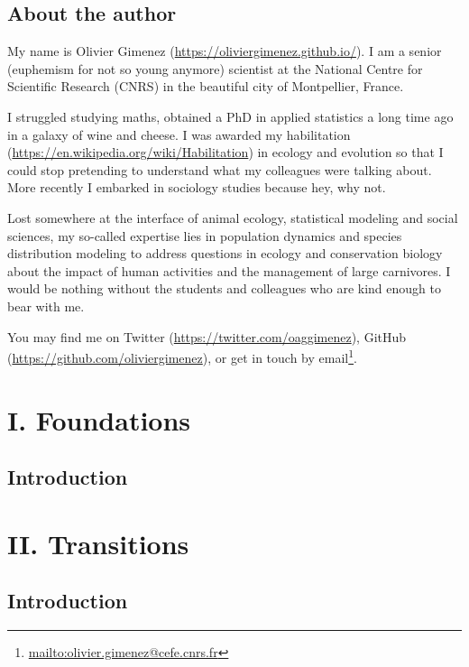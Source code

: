 \documentclass[
  12pt,
]{krantz}
\renewcommand{\href}[2]{#2\footnote{\url{#1}}}
\begin{document}
\hypertarget{about-the-author}{%
\chapter*{About the author}\label{about-the-author}}


My name is Olivier Gimenez (\url{https://oliviergimenez.github.io/}). I am a senior (euphemism for not so young anymore) scientist at the National Centre for Scientific Research (CNRS) in the beautiful city of Montpellier, France.

I struggled studying maths, obtained a PhD in applied statistics a long time ago in a galaxy of wine and cheese. I was awarded my habilitation (\url{https://en.wikipedia.org/wiki/Habilitation}) in ecology and evolution so that I could stop pretending to understand what my colleagues were talking about. More recently I embarked in sociology studies because hey, why not.

Lost somewhere at the interface of animal ecology, statistical modeling and social sciences, my so-called expertise lies in population dynamics and species distribution modeling to address questions in ecology and conservation biology about the impact of human activities and the management of large carnivores. I would be nothing without the students and colleagues who are kind enough to bear with me.

You may find me on Twitter (\url{https://twitter.com/oaggimenez}), GitHub (\url{https://github.com/oliviergimenez}), or get in touch \href{mailto:olivier.gimenez@cefe.cnrs.fr}{by email}.

\mainmatter

\hypertarget{part-i.-foundations}{%
\part{I. Foundations}\label{part-i.-foundations}}

\hypertarget{introduction}{%
\chapter*{Introduction}\label{introduction}}


\hypertarget{part-ii.-transitions}{%
\part{II. Transitions}\label{part-ii.-transitions}}

\hypertarget{introduction-1}{%
\chapter*{Introduction}\label{introduction-1}}
\end{document}
